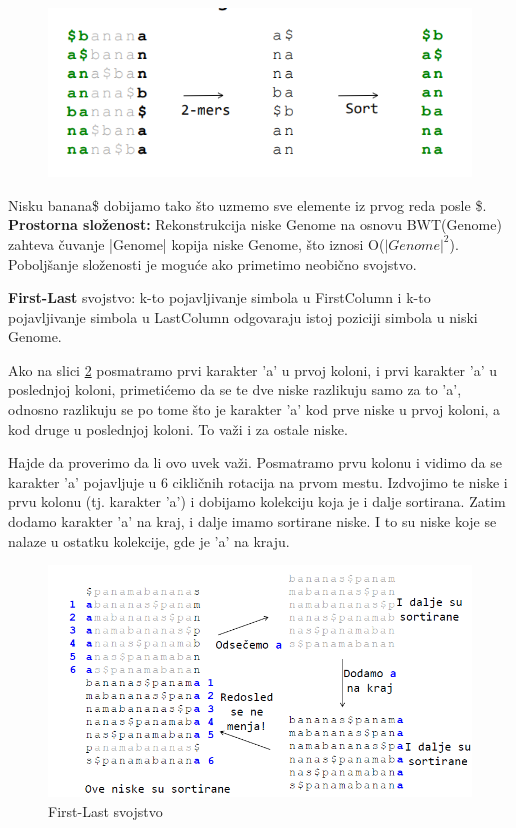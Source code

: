 \begin{figure}[h!]
\centering
\includegraphics[scale=0.5]{poglavlja/9/slike/2-gramskiSastav2.png}
\caption{}
\label{slika:X}
\end{figure}

Nisku banana\$ dobijamo tako što uzmemo sve elemente iz prvog reda posle \$.
\textbf{Prostorna složenost:} Rekonstrukcija niske Genome na osnovu BWT(Genome) zahteva čuvanje |Genome| kopija niske Genome, što iznosi O($|Genome|^2$). Poboljšanje složenosti je moguće ako primetimo neobično svojstvo.

\textbf{First-Last} svojstvo: k-to pojavljivanje simbola u FirstColumn i k-to pojavljivanje simbola u LastColumn odgovaraju istoj poziciji simbola u niski Genome.

Ako na slici \ref{firstLast} posmatramo prvi karakter 'a' u prvoj koloni, i prvi karakter 'a' u poslednjoj koloni, primetićemo da se te dve niske razlikuju samo za to 'a', odnosno razlikuju se po tome što je karakter 'a' kod prve niske u prvoj koloni, a kod druge u poslednjoj koloni. To važi i za ostale niske.

Hajde da proverimo da li ovo uvek važi. Posmatramo prvu kolonu i vidimo da se karakter 'a' pojavljuje u 6 cikličnih rotacija na prvom mestu. Izdvojimo te niske i prvu kolonu (tj. karakter 'a') i dobijamo kolekciju koja je i dalje sortirana. Zatim dodamo karakter 'a' na kraj, i dalje imamo sortirane niske. I to su niske koje se nalaze u ostatku kolekcije, gde je 'a' na kraju.   

\begin{figure}[h!]
\centering
\includegraphics[scale=0.6]{poglavlja/9/slike/firstLast.png}
\caption{First-Last svojstvo}
\label{firstLast}
\end{figure}

